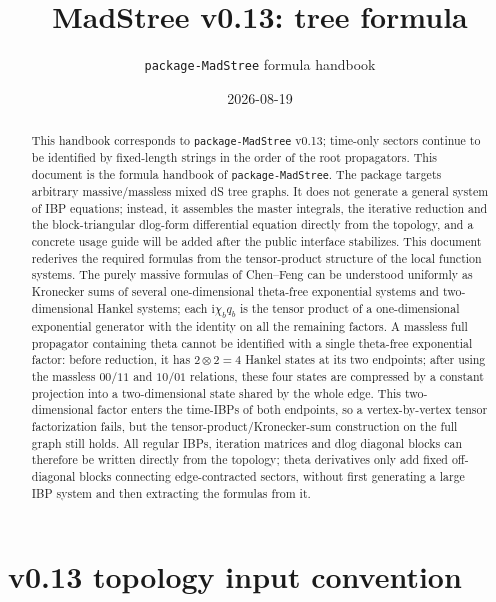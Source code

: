 \documentclass[11pt,a4paper]{article}
\title{MadStree v0.13: tree formula}
\author{\texttt{package-MadStree} formula handbook}
\date{2026-08-19}
\newcommand{\ii}{\mathrm i}
\begin{document}
\maketitle

\begin{abstract}
This handbook corresponds to \texttt{package-MadStree} v0.13; time-only sectors continue to be identified by fixed-length strings in the order of the root propagators.
This document is the formula handbook of \texttt{package-MadStree}. The package targets arbitrary massive/massless mixed dS tree graphs. It does not generate a general system of IBP equations; instead, it assembles the master integrals, the iterative reduction and the block-triangular dlog-form differential equation directly from the topology, and a concrete usage guide will be added after the public interface stabilizes. This document rederives the required formulas from the tensor-product structure of the local function systems. The purely massive formulas of Chen--Feng can be understood uniformly as Kronecker sums of several one-dimensional theta-free exponential systems and two-dimensional Hankel systems; each $\ii\chi_bq_b$ is the tensor product of a one-dimensional exponential generator with the identity on all the remaining factors. A massless full propagator containing theta cannot be identified with a single theta-free exponential factor: before reduction, it has $2\otimes2=4$ Hankel states at its two endpoints; after using the massless $00/11$ and $10/01$ relations, these four states are compressed by a constant projection into a two-dimensional state shared by the whole edge. This two-dimensional factor enters the time-IBPs of both endpoints, so a vertex-by-vertex tensor factorization fails, but the tensor-product/Kronecker-sum construction on the full graph still holds. All regular IBPs, iteration matrices and dlog diagonal blocks can therefore be written directly from the topology; theta derivatives only add fixed off-diagonal blocks connecting edge-contracted sectors, without first generating a large IBP system and then extracting the formulas from it.
\end{abstract}

\tableofcontents

\section{v0.13 topology input convention}
\end{document}

